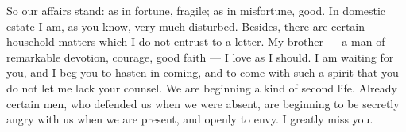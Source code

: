  So our affairs stand: as in fortune, fragile; as in misfortune, good. In domestic estate I am, as you know, very much disturbed. Besides, there are certain household matters which I do not entrust to a letter. My brother --- a man of remarkable devotion, courage, good faith --- I love as I should. I am waiting for you, and I beg you to hasten in coming, and to come with such a spirit that you do not let me lack your counsel. We are beginning a kind of second life. Already certain men, who defended us when we were absent, are beginning to be secretly angry with us when we are present, and openly to envy. I greatly miss you.
